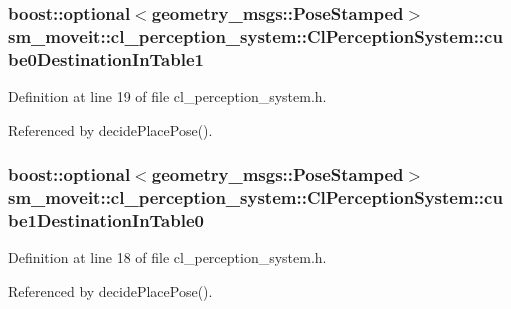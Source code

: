 \subsubsection[{\texorpdfstring{cube0\+Destination\+In\+Table1}{cube0DestinationInTable1}}]{\setlength{\rightskip}{0pt plus 5cm}boost\+::optional$<$geometry\+\_\+msgs\+::\+Pose\+Stamped$>$ sm\+\_\+moveit\+::cl\+\_\+perception\+\_\+system\+::\+Cl\+Perception\+System\+::cube0\+Destination\+In\+Table1}\hypertarget{classsm__moveit_1_1cl__perception__system_1_1ClPerceptionSystem_ab84bbc2d5e5a7ef7839a0ade56942679}{}\label{classsm__moveit_1_1cl__perception__system_1_1ClPerceptionSystem_ab84bbc2d5e5a7ef7839a0ade56942679}


Definition at line 19 of file cl\+\_\+perception\+\_\+system.\+h.



Referenced by decide\+Place\+Pose().

\subsubsection[{\texorpdfstring{cube1\+Destination\+In\+Table0}{cube1DestinationInTable0}}]{\setlength{\rightskip}{0pt plus 5cm}boost\+::optional$<$geometry\+\_\+msgs\+::\+Pose\+Stamped$>$ sm\+\_\+moveit\+::cl\+\_\+perception\+\_\+system\+::\+Cl\+Perception\+System\+::cube1\+Destination\+In\+Table0}\hypertarget{classsm__moveit_1_1cl__perception__system_1_1ClPerceptionSystem_a13cf34b1fb711829c4ddb9a9e2899ae9}{}\label{classsm__moveit_1_1cl__perception__system_1_1ClPerceptionSystem_a13cf34b1fb711829c4ddb9a9e2899ae9}


Definition at line 18 of file cl\+\_\+perception\+\_\+system.\+h.



Referenced by decide\+Place\+Pose().

